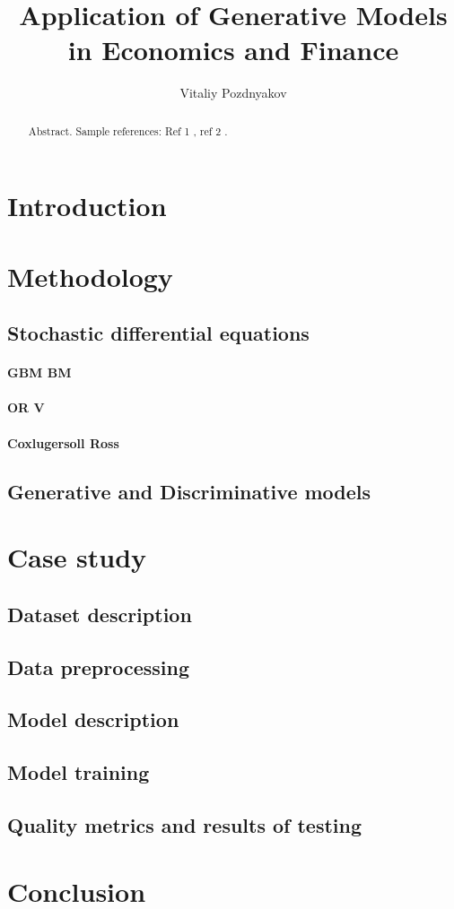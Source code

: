 \documentclass{article}
\title{Application of Generative Models \\ in Economics and Finance}
\author{Vitaliy Pozdnyakov}
\date{}
\begin{document}
\maketitle

\begin{abstract}
    Abstract. Sample references: Ref 1 \cite{renscen}, ref 2 \citet{jebara}.
\end{abstract}

\section{Introduction}

\section{Methodology}

\subsection{Stochastic differential equations}

\paragraph{GBM BM}
\paragraph{OR V}
\paragraph{Coxlugersoll Ross}

\subsection{Generative and Discriminative models}

\section{Case study}

\subsection{Dataset description}

\subsection{Data preprocessing}

\subsection{Model description}

\subsection{Model training}

\subsection{Quality metrics and results of testing}

\section{Conclusion}

\newpage


\end{document}
